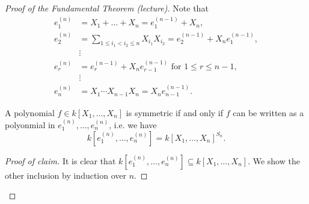 \begin{proof}[Proof of the Fundamental Theorem (lecture)]
 Note that
 \begin{align*}
  e^{(n)}_1 &= X_1 + \ldots + X_n = e_1^{(n-1)} + X_n, \\
  e^{(n)}_2 &= \sum_{1 \leq i_1 < i_2 \leq n} X_{i_1} X_{i_2} = e_2^{(n-1)} + X_n e_1^{(n-1)}, \\
            &\vdots \tag{$\ast$}\\ 
  e^{(n)}_r &= e^{(n-1)}_r + X_n e^{(n-1)}_{r-1} \text{ for } 1 \leq r \leq n-1, \\
            &\vdots \\
  e^{(n)}_n &= X_1 \cdots X_{n-1} X_n = X_n e^{(n-1)}_{n-1}.
 \end{align*}
 \begin{claim}
  A polynomial $f \in k[X_1, \ldots, X_n]$ is symmetric if and only if $f$ can be written as a polyonmial in $e^{(n)}_1, \ldots, e^{(n)}_n$, i.e. we have
  \[
   k\left[e^{(n)}_1, \ldots, e^{(n)}_n\right] = k[X_1, \ldots, X_n]^{S_n}.
  \]
 \end{claim}
 \begin{proof}[Proof of claim]
  It is clear that $k\left[e^{(n)}_1, \ldots, e^{(n)}_n\right] \subseteq k[X_1, \ldots, X_n]$. We show the other inclusion by induction over $n$.
  

\end{proof}
\end{proof}
